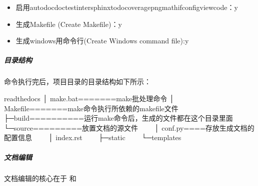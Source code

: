 \documentclass[a4paper,10pt,english]{sphinxmanual}
\begin{document}
\begin{description}
\begin{itemize}
\begin{description}
\begin{figure}[htbp]
\noindent{}
\end{figure}

\end{description}

\item {} \begin{description}
\item[{启用autodoc\textbar{}doctest\textbar{}intersphinx\textbar{}todo\textbar{}coverage\textbar{}pngmath\textbar{}ifconfig\textbar{}viewcode：y}] \leavevmode
\begin{figure}[htbp]
\centering

\noindent{}
\end{figure}

\end{description}

\item {} 
生成Makefile (Create Makefile)：y

\item {} \begin{description}
\item[{生成windows用命令行(Create Windows command file):y}] \leavevmode
\begin{figure}[htbp]
\centering

\noindent{}
\end{figure}

\end{description}

\end{itemize}

\end{description}


\subparagraph{目录结构}
\label{\detokenize{sphinx/1-generate/3-project:id5}}
 命令执行完后，项目目录的目录结构如下所示：

\begin{sphinxVerbatim}[commandchars=\\\{\}]
readthedocs
│ make.bat=======make批处理命令
│ Makefile=======make命令执行所依赖的makefile文件
├─build==========运行make命令后，生成的文件都在这个目录里面
└─source=========放置文档的源文件
　　│ conf.py====存放生成文档的配置信息
　　│ index.rst
　　├─\PYGZus{}static
　　└─\PYGZus{}templates
\end{sphinxVerbatim}


\subparagraph{文档编辑}
\label{\detokenize{sphinx/1-generate/4-edit::doc}}\label{\detokenize{sphinx/1-generate/4-edit:id1}}
文档编辑的核心在于  和 
\end{document}
